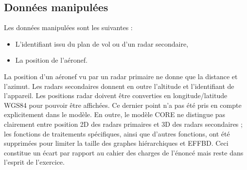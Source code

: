\subsection{ Données manipulées }

Les données manipulées sont les suivantes :
\begin{itemize}
	\item L'identifiant issu du plan de vol ou d'un radar secondaire,
	\item La position de l'aéronef.
\end{itemize}

La position d'un aéronef vu par un radar primaire ne donne que la distance et l'azimut. Les radars secondaires donnent en outre l'altitude et l'identifiant de l'appareil. Les positions radar doivent être converties en longitude/latitude WGS84 pour pouvoir être affichées. Ce dernier point n'a pas été pris en compte explicitement dans le modèle. En outre, le modèle CORE
ne distingue pas clairement entre position 2D des radars primaires et 3D des radars secondaires ; les fonctions de traitements spécifiques, ainsi que d'autres fonctions, ont été supprimées pour limiter la taille des  graphes hiérarchiques et EFFBD. Ceci constitue un écart par rapport au cahier des charges de l'énoncé mais reste dans l'esprit de l'exercice.
